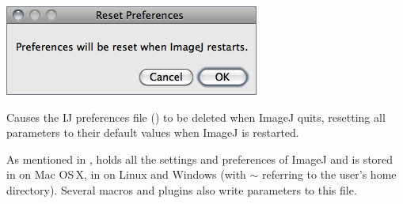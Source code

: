 

\subsubsection[\protect\userinterface{Reset\ldots{}}]{\protect{}\label{sub:ResetOptions}}

\begin{minipage}[c][1\totalheight][t]{0.445\columnwidth}%
\includegraphics[scale=0.55]{images/ResetOptions}%
\end{minipage}%
\begin{minipage}[c][1\totalheight][t]{0.555\columnwidth}%
Causes the IJ preferences file () to be
deleted when ImageJ quits, resetting all parameters
to their default values when ImageJ is restarted.%
\end{minipage}

As mentioned in , 
holds all the settings and preferences of ImageJ and is stored in
 on Mac OS\,X, in 
on Linux and Windows (with $\sim$ referring to the user's home directory).
Several macros and plugins also write parameters to this file.



\clearpage{}


\section{\protect{}\label{sec:Image}}


\subsection{\protect{}\label{sub:Type}}

